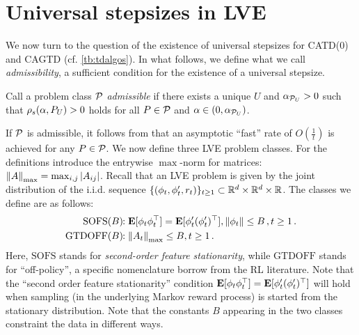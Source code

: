 \section{Universal stepsizes in LVE}\label{sec:rl}
We now turn to the question of the existence of universal stepsizes for CATD(0) and CAGTD (cf. \cref{tb:tdalgos}). 
In what follows, we define what we call \emph{admissibility}, 
a sufficient condition for the existence of a universal stepsize. 
\begin{definition}\label{def:admis}
Call a problem class $\P$ \emph{admissible} if there exists a unique $U$ and $\alpha_{\P_U}>0$ such that
$\rhos{P_U}>0$ holds for all $P\in \P$ and $\alpha\in(0,\alpha_{\P_U})$.
\end{definition}
If $\P$ is admissible, it  follows from  that an asymptotic ``fast'' rate of $O(\frac1t)$ is achieved for any $P\in \cP$. 
We now define three LVE problem classes. For the definitions introduce
the entrywise $\max$-norm for matrices: $\norm{A}_{\max} = \max_{i,j} |A_{ij}|$.
Recall that an LVE problem is given by the joint distribution of the i.i.d. sequence
$\{(\phi_t,\phi_t',r_t)\}_{t\ge 1}\subset \R^d\times \R^d \times \R$. 
The classes we define are as follows:
\begin{align*}
\text{SOFS}(B)&\!\!: \E[\phi_t\phi_t^\top]=\E[\phi'_t(\phi'_t)^\top], %
						\norm{\phi_t}\le B\,, t\ge 1\,.\\
\text{GTDOFF}(B)&\!\!:  \norm{A_t}_{\max} \le B, t\ge 1\,.
\end{align*}
Here, $\text{SOFS}$ stands for \emph{second-order feature stationarity}, 
while $\text{GTDOFF}$ stands for ``off-policy'', a specific nomenclature borrow from the RL literature.
Note that the ``second order feature stationarity'' condition $\E[\phi_t\phi_t^\top]=\E[\phi'_t(\phi'_t)^\top]$ will hold 
when sampling (in the underlying Markov reward process) 
is started from the stationary distribution. 
Note that the constants $B$ appearing in the two classes constraint the data in different ways.
\FloatBarrier
